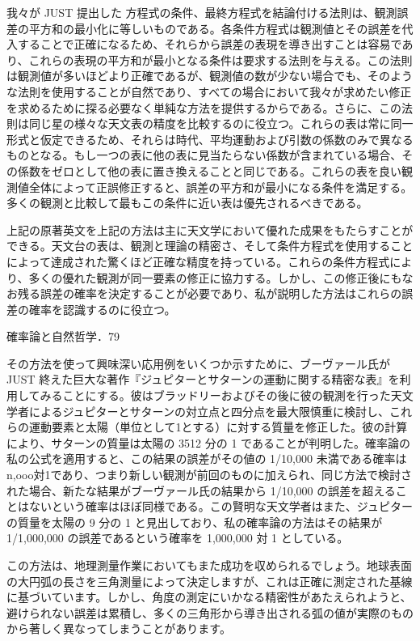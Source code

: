 \documentclass[a4paper,11pt,openany]{ltjsbook}
\begin{document}
我々が JUST 提出した 方程式の条件、最終方程式を結論付ける法則は、観測誤差の平方和の最小化に等しいものである。各条件方程式は観測値とその誤差を代入することで正確になるため、それらから誤差の表現を導き出すことは容易であり、これらの表現の平方和が最小となる条件は要求する法則を与える。この法則は観測値が多いほどより正確であるが、観測値の数が少ない場合でも、そのような法則を使用することが自然であり、すべての場合において我々が求めたい修正を求めるために探る必要なく単純な方法を提供するからである。さらに、この法則は同じ星の様々な天文表の精度を比較するのに役立つ。これらの表は常に同一形式と仮定できるため、それらは時代、平均運動および引数の係数のみで異なるものとなる。もし一つの表に他の表に見当たらない係数が含まれている場合、その係数をゼロとして他の表に置き換えることと同じである。これらの表を良い観測値全体によって正誤修正すると、誤差の平方和が最小になる条件を満足する。多くの観測と比較して最もこの条件に近い表は優先されるべきである。

上記の原著英文を上記の方法は主に天文学において優れた成果をもたらすことができる。天文台の表は、観測と理論の精密さ、そして条件方程式を使用することによって達成された驚くほど正確な精度を持っている。これらの条件方程式により、多くの優れた観測が同一要素の修正に協力する。しかし、この修正後にもなお残る誤差の確率を決定することが必要であり、私が説明した方法はこれらの誤差の確率を認識するのに役立つ。

確率論と自然哲学．79

その方法を使って興味深い応用例をいくつか示すために、ブーヴァール氏が JUST 終えた巨大な著作『ジュピターとサターンの運動に関する精密な表』を利用してみることにする。彼はブラッドリーおよびその後に彼の観測を行った天文学者によるジュピターとサターンの対立点と四分点を最大限慎重に検討し、これらの運動要素と太陽（単位として1とする）に対する質量を修正した。彼の計算により、サターンの質量は太陽の 3512 分の 1 であることが判明した。確率論の私の公式を適用すると、この結果の誤差がその値の 1/10,000 未満である確率は n,ooo対1であり、つまり新しい観測が前回のものに加えられ、同じ方法で検討された場合、新たな結果がブーヴァール氏の結果から 1/10,000 の誤差を超えることはないという確率はほぼ同様である。この賢明な天文学者はまた、ジュピターの質量を太陽の 9 分の 1 と見出しており、私の確率論の方法はその結果が 1/1,000,000 の誤差であるという確率を 1,000,000 対 1 としている。

この方法は、地理測量作業においてもまた成功を収められるでしょう。地球表面の大円弧の長さを三角測量によって決定しますが、これは正確に測定された基線に基づいています。しかし、角度の測定にいかなる精密性があたえられようと、避けられない誤差は累積し、多くの三角形から導き出される弧の値が実際のものから著しく異なってしまうことがあります。
\end{document}
